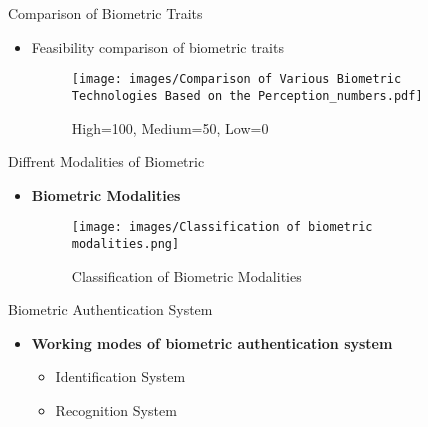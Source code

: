\begin{frame}[t]{Comparison of Biometric Traits}
	\topline
	\begin{itemize}
		\item Feasibility comparison of biometric traits \cite{Jain2004}
			\begin{figure}[!ht]
				\centering 
				\texttt{[image: images/Comparison of Various Biometric Technologies Based on the Perception\_numbers.pdf]}
				\caption{High=100, Medium=50, Low=0\cite{Jain2004} }
			\end{figure}
	\end{itemize}
\end{frame}


\begin{frame}[t]{Diffrent Modalities of Biometric}
	\topline
    \begin{itemize}
    	\item \textcolor{navy_theme}{\textbf{Biometric Modalities}}
			\begin{figure}[!ht]
				\centering 
				\texttt{[image: images/Classification of biometric modalities.png]}
				\caption{Classification of Biometric Modalities}
				\label{fig:bio_class_mod}
			\end{figure}
	\end{itemize}
\end{frame}

\begin{frame}[t]{Biometric Authentication System}
	\topline
    \begin{itemize}
    	\item \textcolor{navy_theme}{\textbf{Working modes of biometric authentication system}}
		\vspace{1em}
			\begin{itemize}
				\setlength\itemsep{1.5em}
				\item<1> Identification System
				\item<2> Recognition System
			\end{itemize}
	\end{itemize}
\end{frame}

